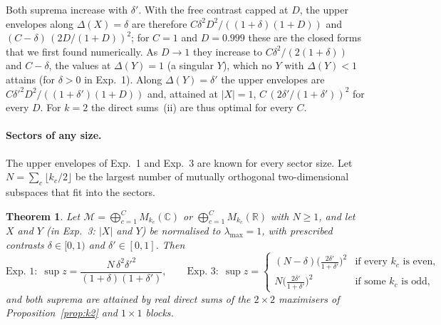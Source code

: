 \documentclass[11pt]{article}
\newcommand{\C}{\mathbb{C}}
\newcommand{\M}{\mathcal{M}}
\newtheorem{theorem}[proposition]{Theorem}
\begin{document}
\noindent Both suprema increase with $\delta'$. With the free contrast capped at $D$, the upper envelopes along
$\Delta(X)=\delta$ are therefore $C\delta^2D^2/((1+\delta)(1+D))$ and $(C-\delta)\,(2D/(1+D))^2$; for $C=1$ and $D=0.999$ these
are the closed forms that we first found numerically. As $D\to1$ they increase
to $C\delta^2/(2(1+\delta))$ and $C-\delta$, the values at $\Delta(Y)=1$ (a singular $Y$), which no $Y$ with $\Delta(Y)<1$
attains (for $\delta>0$ in Exp.~1). Along $\Delta(Y)=\delta'$ the upper envelopes are $C\delta'^2D^2/((1+\delta')(1+D))$ and,
attained at $|X|=1$, $C\,(2\delta'/(1+\delta'))^2$ for every $D$. For $k=2$ the direct sums~(ii) are thus optimal for every
$C$.

\paragraph{Sectors of any size.} The upper envelopes of Exp.~1 and Exp.~3 are known for every sector size. Let
$N=\sum_c\lfloor k_c/2\rfloor$ be the largest number of mutually orthogonal two-dimensional subspaces that fit into the
sectors.

\begin{theorem}\label{thm:allk}
Let $\M=\bigoplus_{c=1}^CM_{k_c}(\C)$ or $\bigoplus_{c=1}^CM_{k_c}(\mathbb R)$ with $N\ge1$, and let $X$ and $Y$ (in Exp.~3:
$|X|$ and $Y$) be normalised to $\lambda_{\max}=1$, with prescribed contrasts $\delta\in[0,1)$ and $\delta'\in[0,1]$. Then
\[
  \text{Exp.~1:}\ \ \sup z=\frac{N\,\delta^2\delta'^2}{(1+\delta)(1+\delta')},\qquad
  \text{Exp.~3:}\ \ \sup z=\begin{cases}(N-\delta)\bigl(\frac{2\delta'}{1+\delta'}\bigr)^2&\text{if every }k_c\text{ is even},\\[2pt]
  N\bigl(\frac{2\delta'}{1+\delta'}\bigr)^2&\text{if some }k_c\text{ is odd},\end{cases}
\]
and both suprema are attained by real direct sums of the $2\times2$ maximisers of Proposition~\ref{prop:k2} and
$1\times1$ blocks.
\end{theorem}
\end{document}
